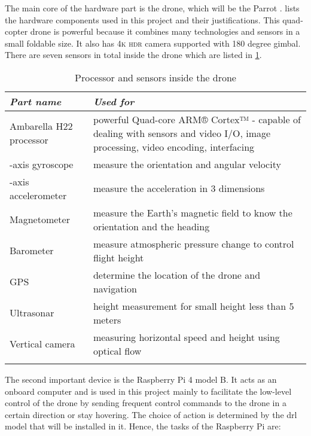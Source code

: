 \documentclass[../main.tex]{subfiles}
\begin{document}
The main core of the hardware part is the drone, 
which will be the Parrot \anafi.
 lists the hardware components
used in this project and their justifications. This quad-copter
drone is powerful because it combines many technologies 
and sensors in a small foldable size. It also has 4\textsc{k}
\textsc{hdr} camera supported with 180 degree gimbal. 
There are seven sensors in total inside the drone which are listed in 
\cref{tab:sensors-table}. 

\begin{table}[tbp]
	\centering
	\caption{Processor and sensors inside the drone}
	\label{tab:sensors-table}  
	\begin{tabular}{ p{4cm} p{8cm} }
		\toprule
		\textit{Part name} 
		& \textit{Used for}  \\ 
		
		\midrule
		\raggedright Ambarella H22 
		processor
		& powerful Quad-core ARM® Cortex™ - capable of dealing with sensors and video I/O, 
		image processing, video encoding, interfacing \\ 
                \addlinespace
		3-axis gyroscope
		& measure the orientation and angular velocity  \\ 
                \addlinespace
		3-axis accelerometer
		& measure the acceleration in 3 dimensions  \\ 
                \addlinespace
		Magnetometer 
		& measure the Earth's magnetic field to know the orientation and the heading   \\ 
                \addlinespace
				Barometer 
		& measure atmospheric pressure change to control flight height   \\ 
                \addlinespace
				GPS 
		& determine the location of the drone and navigation  \\ 
                \addlinespace
				Ultrasonar 
		&  height measurement for small height less than 5 meters  \\ 
                \addlinespace
				Vertical camera 
		&  measuring horizontal speed and height using optical flow \\ 
                \addlinespace
        \bottomrule
    \end{tabular}
\end{table}   

The second important device is the Raspberry Pi 4 model B. It 
acts as an onboard computer and is used in this project
mainly to facilitate the low-level control of the drone
by sending frequent control commands to the drone
in a certain direction or stay hovering.
The choice of action is determined by the \gls{drl}
model that will be installed in it.
Hence, the tasks of the Raspberry Pi are: 
\end{document}
